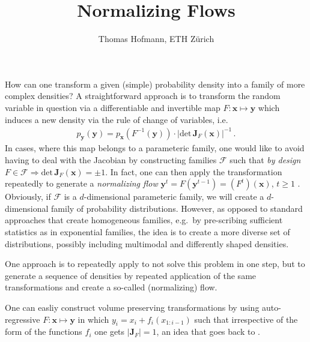 \documentclass[twocolumn]{article}
\title{Normalizing Flows}
\author{Thomas Hofmann, ETH Z\"urich}
\newcommand{\x}{{\mathbf x}}
\newcommand{\y}{{\mathbf y}}
\begin{document}
 

\maketitle 

How can one transform a given (simple) probability density into a family of more complex densities? A straightforward approach is to transform the random variable in question via a differentiable and  invertible map $F: \x \mapsto \y$ which induces a new density via the rule of change of variables, i.e.
\begin{align}
p_\y(\y) = p_\x(F^{-1}(\y))  \cdot |\text{det} \, \mathbf J_F(\x)|^{-1}\,.
\end{align}
In cases, where this map belongs to a parameteric family, one would like to avoid having to deal with the Jacobian by constructing families $\mathcal F$ such that \textit{by design} $F\in \mathcal F \Longrightarrow \text{det}  \, \mathbf J_{F}(\x)= \pm 1$. In fact, one can then apply the transformation repeatedly to generate a \textit{normalizing flow} $\y^t = F(\y^{t-1}) = (F^t)(\x)$, $t \ge 1$ \cite{rezende2015variational}. Obviously, if $\mathcal F$  is a $d$-dimensional parameteric family, we will create a $d$-dimensional family of probability distributions. However, as opposed to standard approaches that create homogeneous families, e.g.~by pre-scribing sufficient statistics as in exponential families, the idea is to create a more diverse set of distributions, possibly including multimodal and differently shaped densities.

\newpage


One approach is to repeatedly apply to not solve this problem in one step, but to  generate a sequence of densities by repeated application of the same transformations and create a so-called (normalizing) flow. 

\newpage


One can easliy construct volume preserving transformations by using auto-regressive $F: \x \mapsto \y$ in which $y_i =x_i + f_i(x_{1:i-1})$ such that irrespective of the form of the functions $f_i$ one gets $|\mathbf J_F|=1$, an idea that goes back to \cite{deco1995nonlinear}.





\end{document}
